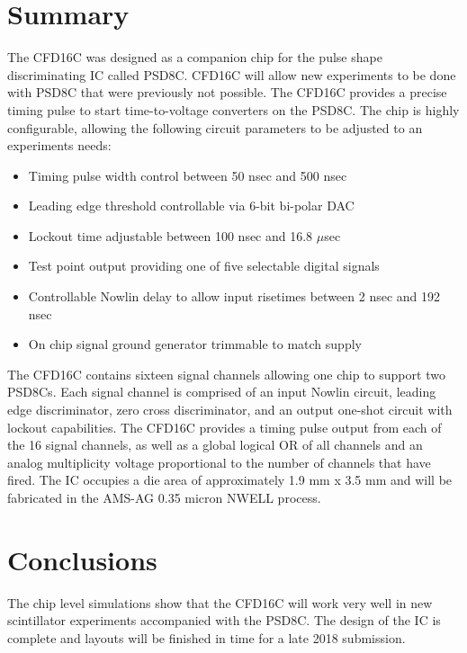 \documentclass[12pt,oneside,final]{siuethesis}
\theoremstyle{definition}
\begin{document}
\section{Summary}
\par The CFD16C was designed as a companion chip for the pulse shape discriminating IC called PSD8C. CFD16C will allow new experiments to be done with PSD8C that were previously not possible. The CFD16C provides a precise timing pulse to start time-to-voltage converters on the PSD8C. The chip is highly configurable, allowing the following circuit parameters to be adjusted to an experiments needs:

\begin{itemize}
\item Timing pulse width control between 50 nsec and 500 nsec
\item Leading edge threshold controllable via 6-bit bi-polar DAC
\item Lockout time adjustable between 100 nsec and 16.8 $\mu$sec
\item Test point output providing one of five selectable digital signals
\item Controllable Nowlin delay to allow input risetimes between 2 nsec and 192 nsec
\item On chip signal ground generator trimmable to match supply
\end{itemize}

\par The CFD16C contains sixteen signal channels allowing one chip to support two PSD8Cs. Each signal channel is comprised of an input Nowlin circuit, leading edge discriminator, zero cross discriminator, and an output one-shot circuit with lockout capabilities. The CFD16C provides a timing pulse output from each of the 16 signal channels, as well as a global logical OR of all channels and an analog multiplicity voltage proportional to the number of channels that have fired. The IC occupies a die area of approximately 1.9 mm x 3.5 mm and will be fabricated in the AMS-AG 0.35 micron NWELL process.
\section{Conclusions}
\par The chip level simulations show that the CFD16C will work very well in new scintillator experiments accompanied with the PSD8C. The design of the IC is complete and layouts will be finished in time for a late 2018 submission.
\end{document}
